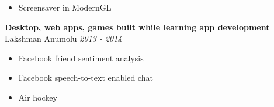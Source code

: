 \documentclass{res}
\begin{document}
\begin{resume}
\begin{itemize}[leftmargin=*]
	\item Screensaver in ModernGL
	\end{itemize}
	
	{\bf Desktop, web apps, games built while learning app development} \\
	Lakshman Anumolu \hfill {\it 2013 - 2014}
	\begin{itemize}[leftmargin=*]
	\setlength{\itemsep}{0mm} \smallskip
	
	\item Facebook friend sentiment analysis
	\item Facebook speech-to-text enabled chat
	\item Air hockey
	\end{itemize}
	
	
	
	
	
	
	
	
	
	
	
	
	\end{resume}
	
\end{document}

